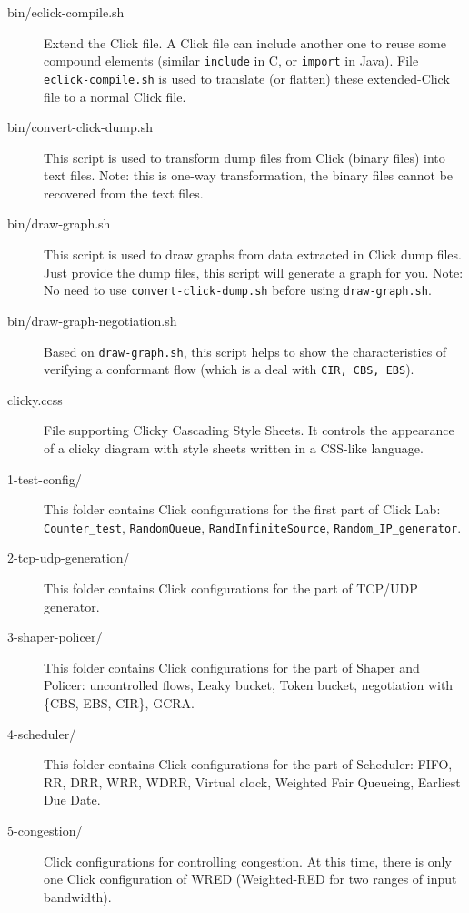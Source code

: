 \documentclass[a4paper]{article}
\begin{document}
\begin{description}
      	\item[bin/eclick-compile.sh] Extend the Click file. A Click file can include another one to reuse some compound elements (similar \texttt{include} in C, or \texttt{import} in Java). File \texttt{eclick-compile.sh} is used to translate (or flatten) these extended-Click file to a normal Click file.
      	\item[bin/convert-click-dump.sh]This script is used to transform dump files from Click (binary files) into text files. Note: this is one-way transformation, the binary files cannot be recovered from the text files.
      	\item[bin/draw-graph.sh] This script is used to draw graphs from data extracted in Click dump files. Just provide the dump files, this script will generate a graph for you. Note: No need to use \texttt{convert-click-dump.sh} before using \texttt{draw-graph.sh}.
      	\item[bin/draw-graph-negotiation.sh] Based on \texttt{draw-graph.sh}, this script helps to show the characteristics of verifying a conformant flow (which is a deal with \texttt{CIR, CBS, EBS}).
      	\item[clicky.ccss] File supporting Clicky Cascading Style Sheets. It controls the appearance of a clicky diagram with style sheets written in a CSS-like language.      	
      	\item[1-test-config/] This folder contains Click configurations for the first part of Click Lab: \texttt{Counter\_test}, \texttt{RandomQueue}, \texttt{RandInfiniteSource}, \texttt{Random\_IP\_generator}.
      	\item[2-tcp-udp-generation/] This folder contains Click configurations for the part of TCP/UDP generator.
      	\item[3-shaper-policer/] This folder contains Click configurations for the part of Shaper and Policer: uncontrolled flows, Leaky bucket, Token bucket, negotiation with \{CBS, EBS, CIR\}, GCRA.
      	\item[4-scheduler/] This folder contains Click configurations for the part of Scheduler: FIFO, RR, DRR, WRR, WDRR, Virtual clock, Weighted Fair Queueing, Earliest Due Date.
      	\item[5-congestion/] Click configurations for controlling congestion. At this time, there is only one Click configuration of WRED (Weighted-RED for two ranges of input bandwidth).
      \end{description}
    
\end{document}
